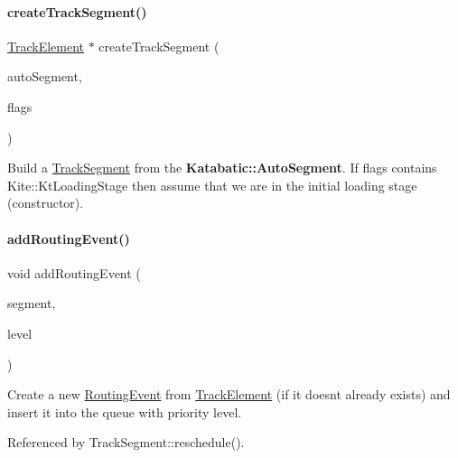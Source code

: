 \paragraph{\texorpdfstring{create\+Track\+Segment()}{createTrackSegment()}}
{\footnotesize\ttfamily \mbox{\hyperlink{classKite_1_1TrackElement}{Track\+Element}} $\ast$ create\+Track\+Segment (\begin{DoxyParamCaption}\item[{\textbf{ Auto\+Segment} $\ast$}]{auto\+Segment,  }\item[{unsigned int}]{flags }\end{DoxyParamCaption})}

Build a \mbox{\hyperlink{classKite_1_1TrackSegment}{Track\+Segment}} from the \textbf{ Katabatic\+::\+Auto\+Segment}. If {\ttfamily flags} contains Kite\+::\+Kt\+Loading\+Stage then assume that we are in the initial loading stage (constructor). \mbox{\label{classKite_1_1NegociateWindow_a51ba8e6a122c0cb93174027658cade63}} 
\paragraph{\texorpdfstring{add\+Routing\+Event()}{addRoutingEvent()}}
{\footnotesize\ttfamily void add\+Routing\+Event (\begin{DoxyParamCaption}\item[{\mbox{\hyperlink{classKite_1_1TrackElement}{Track\+Element}} $\ast$}]{segment,  }\item[{unsigned int}]{level }\end{DoxyParamCaption})}

Create a new \mbox{\hyperlink{classKite_1_1RoutingEvent}{Routing\+Event}} from \mbox{\hyperlink{classKite_1_1TrackElement}{Track\+Element}} (if it doesn\textquotesingle{}t already exists) and insert it into the queue with priority {\ttfamily level}. 

Referenced by Track\+Segment\+::reschedule().

\mbox{\label{classKite_1_1NegociateWindow_acad8f73494d122463d65797d337ce275}} 

